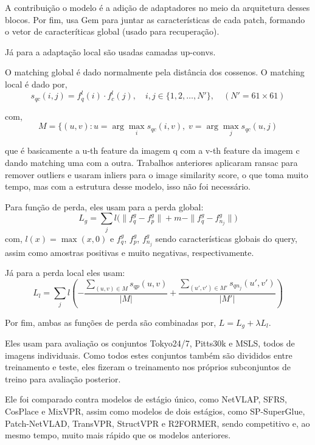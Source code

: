 \documentclass[letterpaper, 10 pt, conference]{ieeeconf}  %
\begin{document}
A contribuição o modelo é a adição de adaptadores no meio da arquitetura desses blocos. Por fim, usa Gem para juntar as características de cada patch, formando o vetor de caracteríticas global (usado para recuperação).

Já para a adaptação local são usadas camadas up-convs. 

O matching global é dado normalmente pela distância dos cossenos. O matching local é dado por,
$$
s_{qc}(i, j) = f_q^{l}(i) \cdot f_c^{l}(j), 
\quad i,j \in \{1,2,\dots,N'\}, \quad (N' = 61 \times 61)
$$

com,
$$
M = \{(u,v) : 
u = \arg\max_i s_{qc}(i,v), \;
v = \arg\max_j s_{qc}(u,j)
$$

que é basicamente a u-th feature da imagem q com a v-th feature da imagem c dando matching uma com a outra. Trabalhos anteriores aplicaram ransac para remover outliers e usaram inliers para o image similarity score, o que toma muito tempo, mas com a estrutura desse modelo, isso não foi necessário. 

Para função de perda, eles usam para a perda global:
$$
L_g =
\sum_j
l\big(
\|f_q^g - f_p^g\|
+ m
- \|f_q^g - f_{n_j}^g\|
\big)

$$
com,
$l(x) = \max(x,0)$ e $f_q^g$, $f_p^g$, $f_{n_j}^g$ sendo características globais do query, assim como amostras positivas e muito negativas, respectivamente.

Já para a perda local eles usam: 
$$
L_l =
\sum_j
l\left(
-
\frac{
\sum_{(u,v)\in M} s_{qp}(u,v)
}{|M|}
+
\frac{
\sum_{(u',v')\in M'} s_{q n_j}(u',v')
}{|M'|}
\right)
$$


Por fim, ambas as funções de perda são combinadas por, 
$L = L_g + \lambda L_l$.


Eles usam para avaliação os conjuntos Tokyo24/7, Pitts30k e MSLS, todos de imagens individuais. Como todos estes conjuntos também são divididos entre treinamento e teste, eles fizeram o treinamento nos próprios subconjuntos de treino para avaliação posterior. 

Ele foi comparado contra modelos de estágio único, como NetVLAP, SFRS, CosPlace e MixVPR, assim como modelos de dois estágios, como SP-SuperGlue, Patch-NetVLAD, TransVPR, StructVPR e R2FORMER, sendo competitivo e, ao mesmo tempo, muito mais rápido que os modelos anteriores. 

\subsection{}
\end{document}
